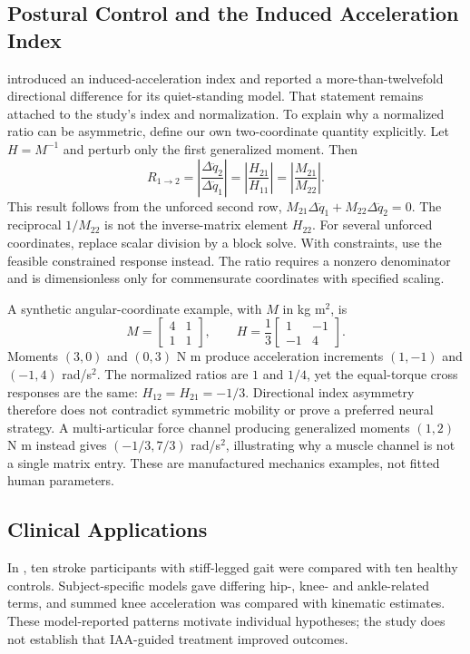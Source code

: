 \subsection{Postural Control and the Induced Acceleration Index}

\cite{Challis2011} introduced an induced-acceleration index and reported a more-than-twelvefold directional difference for its quiet-standing model. That statement remains attached to the study's index and normalization. To explain why a normalized ratio can be asymmetric, define our own two-coordinate quantity explicitly. Let $H=M^{-1}$ and perturb only the first generalized moment. Then
\[
R_{1\to2}=\left|\frac{\Delta\ddot q_2}{\Delta\ddot q_1}\right|
=\left|\frac{H_{21}}{H_{11}}\right|
=\left|\frac{M_{21}}{M_{22}}\right|.
\]
This result follows from the unforced second row, $M_{21}\Delta\ddot q_1+M_{22}\Delta\ddot q_2=0$. The reciprocal $1/M_{22}$ is not the inverse-matrix element $H_{22}$. For several unforced coordinates, replace scalar division by a block solve. With constraints, use the feasible constrained response instead. The ratio requires a nonzero denominator and is dimensionless only for commensurate coordinates with specified scaling.

A synthetic angular-coordinate example, with $M$ in kg m$^2$, is
\[
M=\begin{bmatrix}4&1\\1&1\end{bmatrix},\qquad
H=\frac13\begin{bmatrix}1&-1\\-1&4\end{bmatrix}.
\]
Moments $(3,0)$ and $(0,3)$ N m produce acceleration increments $(1,-1)$ and $(-1,4)$ rad/s$^2$. The normalized ratios are $1$ and $1/4$, yet the equal-torque cross responses are the same: $H_{12}=H_{21}=-1/3$. Directional index asymmetry therefore does not contradict symmetric mobility or prove a preferred neural strategy. A multi-articular force channel producing generalized moments $(1,2)$ N m instead gives $(-1/3,7/3)$ rad/s$^2$, illustrating why a muscle channel is not a single matrix entry. These are manufactured mechanics examples, not fitted human parameters.

\subsection{Clinical Applications}

In \cite{RileyKerrigan1999}, ten stroke participants with stiff-legged gait were compared with ten healthy controls. Subject-specific models gave differing hip-, knee- and ankle-related terms, and summed knee acceleration was compared with kinematic estimates. These model-reported patterns motivate individual hypotheses; the study does not establish that IAA-guided treatment improved outcomes.

